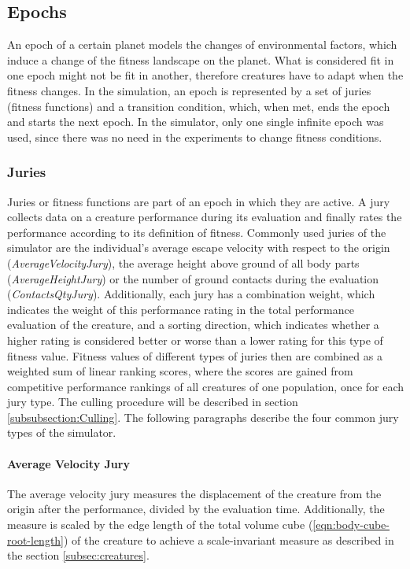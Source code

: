 \documentclass[main]{subfiles}
\begin{document}
\subsection{Epochs}

An epoch of a certain planet models the changes of environmental factors, which induce a change of the fitness landscape on the planet. %
%
What is considered fit in one epoch might not be fit in another, therefore creatures have to adapt when the fitness changes. %
%
In the simulation, an epoch is represented by a set of juries (fitness functions) and a transition condition, which, when met, ends the epoch and starts the next epoch. %
%
In the simulator, only one single infinite epoch was used, since there was no need in the experiments to change fitness conditions.

\subsubsection{Juries}

Juries or fitness functions are part of an epoch in which they are active. %
%
A jury collects data on a creature performance during its evaluation and finally rates the performance according to its definition of fitness. %
%
Commonly used juries of the simulator are the individual's average escape velocity with respect to the origin \mbox{(\textit{AverageVelocityJury})}, the average height above ground of all body parts \mbox{(\textit{AverageHeightJury})} or the number of ground contacts during the evaluation \mbox{(\textit{ContactsQtyJury})}. %
%
Additionally, each jury has a combination weight, which indicates the weight of this performance rating in the total performance evaluation of the creature, and a sorting direction, which indicates whether a higher rating is considered better or worse than a lower rating for this type of fitness value. %
%
Fitness values of different types of juries then are combined as a weighted sum of  linear ranking scores, where the scores are gained from competitive performance rankings of all creatures of one population, once for each jury type. %
%
The culling procedure will be described in section \ref{subsubsection:Culling}. %
%
The following paragraphs describe the four common jury types of the simulator.

\paragraph{Average Velocity Jury} The average velocity jury measures the displacement of the creature from the origin after the performance, divided by the evaluation time. %
%
Additionally, the measure is scaled by the edge length of the total volume cube (\eqref{eqn:body-cube-root-length}) of the creature to achieve a scale-invariant measure as described in the section \ref{subsec:creatures}.
\end{document}
